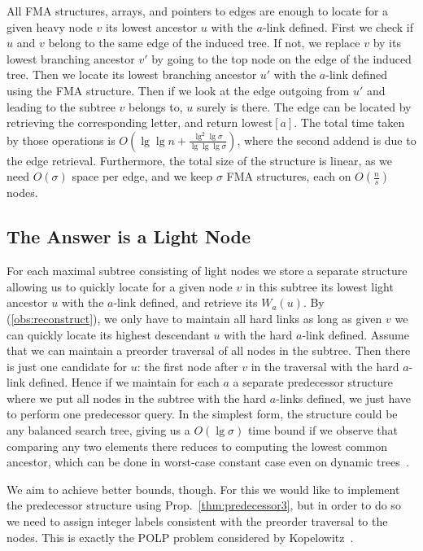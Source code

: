 \documentclass[11pt,onecolumn,final]{article} \usepackage{a4}
\theoremstyle{plain}
\theoremstyle{remark}
\begin{document}
All FMA structures, arrays, and pointers to edges are enough to locate for a given heavy node $v$ its lowest ancestor $u$ with the $a$-link defined. First we check if $u$ and $v$ belong to the same edge of the induced tree. If not, we replace $v$ by its lowest branching ancestor $v'$ by going to the top node on the edge of the induced tree. Then we locate its lowest branching ancestor $u'$ with the $a$-link defined using the FMA structure. Then if we look at the edge outgoing from $u'$ and leading to the subtree $v$ belongs to, $u$ surely is there.
The edge can be located by retrieving the corresponding letter, and return $\mathrm{lowest}[a]$. The total time taken by those operations is $O(\lg\lg n + \frac{\lg^2\lg\sigma}{\lg\lg\lg\sigma})$, where the second addend is due to the edge retrieval. Furthermore, the total size of the structure is linear, as we need $O(\sigma)$ space per edge, and we keep $\sigma$ FMA structures, each on $O(\frac{n}{s})$ nodes.

\subsection{The Answer is a Light Node}
For each maximal subtree consisting of light nodes we store a separate structure allowing us to quickly locate for a given node $v$ in this subtree its lowest light ancestor $u$ with the $a$-link defined, and retrieve its $W_a(u)$. By (\ref{obs:reconstruct}), we only have to maintain all hard links as long as given $v$ we can quickly locate its highest descendant $u$ with the hard $a$-link defined. Assume that we can maintain a preorder traversal of all nodes in the subtree. Then there is just one candidate for $u$:
the first node after $v$ in the traversal with the hard $a$-link defined. Hence if we maintain for each $a$ a separate predecessor structure where we put all nodes in the subtree with the hard $a$-links defined, we just have to perform one predecessor query. In the simplest form, the structure could be any balanced search tree, giving us a $O(\lg\sigma)$ time bound if we observe that comparing any two elements there reduces to computing the lowest common ancestor, which can be done in worst-case constant case even on dynamic trees~\cite{cole05dynamic}.

We aim to achieve better bounds, though. For this we would like to implement the predecessor structure using Prop.~\ref{thm:predecessor3}, but in order to do so we need to assign integer labels consistent with the preorder traversal to the nodes. This is exactly the POLP problem considered by Kopelowitz~\cite{Kopelot12indexing}. 
\end{document}
